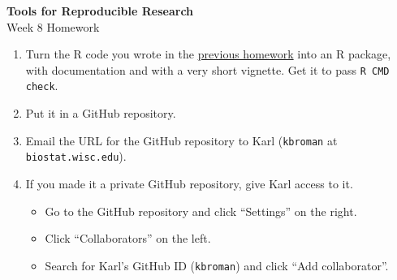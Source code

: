 \documentclass[12pt]{article}
\newcommand{\ttsm}{\tt \small}
\begin{document}
\thispagestyle{empty}

\textbf{Tools for Reproducible Research} \\
Week 8 Homework

\bigskip

\begin{enumerate}
\item Turn the R code you wrote in the
  \href{http://kbroman.org/Tools4RR/assets/homework/08_homework.pdf}{previous
    homework} into an R package, with documentation and with a very
  short vignette. Get it to pass {\ttsm R CMD check}.

\item Put it in a GitHub repository.

\item Email the URL for the GitHub repository to Karl ({\ttsm kbroman}
  at {\ttsm biostat.wisc.edu}).

\item If you made it a private GitHub repository, give Karl access to
  it.
  \begin{itemize}
  \item Go to the GitHub repository and click ``Settings'' on the
    right.
  \item Click ``Collaborators'' on the left.
  \item Search for Karl's GitHub ID ({\ttsm kbroman}) and click ``Add
    collaborator''.
  \end{itemize}


\end{enumerate}
\end{document}
